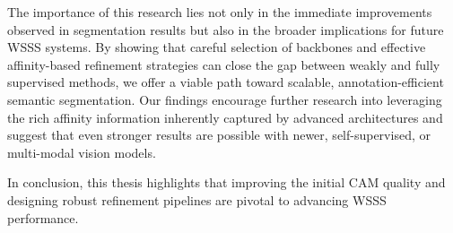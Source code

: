 The importance of this research lies not only in the immediate improvements observed in segmentation results but also in the broader implications for future WSSS systems. By showing that careful selection of backbones and effective affinity-based refinement strategies can close the gap between weakly and fully supervised methods, we offer a viable path toward scalable, annotation-efficient semantic segmentation. Our findings encourage further research into leveraging the rich affinity information inherently captured by advanced architectures and suggest that even stronger results are possible with newer, self-supervised, or multi-modal vision models.

In conclusion, this thesis highlights that improving the initial CAM quality and designing robust refinement pipelines are pivotal to advancing WSSS performance. 